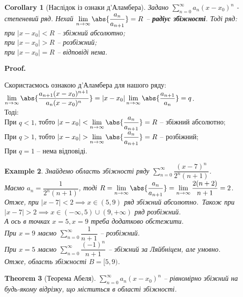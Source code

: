 \documentclass[a4paper, 10pt]{article}
\makeatletter
\def\huge{\displaystyle}
\def\qed{$\blacksquare$}
\theoremstyle{theoremdd}
\newtheorem{theorem}{Theorem}[subsection]
\theoremstyle{theoremdd}
\theoremstyle{theoremdd}
\theoremstyle{theoremdd}
\theoremstyle{theoremdd}
\newtheorem{example}[theorem]{Example}
\theoremstyle{theoremdd}
\theoremstyle{theoremdd}
\theoremstyle{theoremdd}
\theoremstyle{theoremdd}
\newtheorem{corollary}[theorem]{Corollary}
\renewenvironment{proof}[1][Proof.\\]{\par
\pushQED{\hfill \qed}%
\normalfont \topsep6\p@\@plus6\p@\relax
\trivlist
\item\relax
{\bfseries
#1\@addpunct{.}}\hspace\labelsep\ignorespaces
}{%
\popQED\endtrivlist\@endpefalse
}
\makeatother
\begin{document}
\begin{corollary}[Наслідок із ознаки д'Аламбера]
Задано $\huge \sum_{n=0}^\infty a_n(x-x_0)^n$ - степеневий ряд. Нехай $\huge \lim_{n \to \infty} \abs{\dfrac{a_n}{a_{n+1}}} = R$ -- \textbf{радіус збіжності}. Тоді ряд:\\
при $|x-x_0|<R$ -- збіжний абсолютно;\\
при $|x-x_0|>R$ -- розбіжний;\\
при $|x-x_0|=R$ -- відповіді нема.
\end{corollary}

\begin{proof}
Скористаємось ознакою д'Аламбера для нашого ряду:\\
$\huge \lim_{n \to \infty} \abs{\dfrac{a_{n+1}(x-x_0)^{n+1}}{a_n(x-x_0)^n}} = |x-x_0| \lim_{n \to \infty} \abs{\dfrac{a_{n+1}}{a_n}} = q$.\\
Тоді:\\
При $q < 1$, тобто $|x-x_0| < \huge \lim_{n \to \infty} \abs{\dfrac{a_n}{a_{n+1}}} = R$ -- збіжний абсолютно;\\
При $q > 1$, тобто $|x-x_0| > \huge \lim_{n \to \infty} \abs{\dfrac{a_n}{a_{n+1}}} = R$ -- розбіжний;\\
При $q = 1$ -- нема відповіді.
\end{proof}

\begin{example}
Знайдемо область збіжності ряду $\huge\sum_{n=0}^\infty \dfrac{(x-7)^n}{2^n (n+1)}$.\\
Маємо $a_n = \dfrac{1}{2^n (n+1)}$, тоді $R = \huge\lim_{n \to \infty} \abs{\dfrac{a_n}{a_{n+1}}} = \lim_{n \to \infty} \dfrac{2(n+2)}{n+1} = 2$.\\
Отже, при $|x-7| < 2 \implies x \in (5,9)$ ряд збіжний абсолютно.\
Також при $|x-7| > 2 \implies x \in (-\infty,5) \cup (9,+\infty)$ ряд розбіжний.\\
А ось в точках $x = 5, x = 9$ треба додатково обстежити.\\
При $x=9$ маємо $\huge\sum_{n=0}^\infty \dfrac{1}{n+1}$ -- розбіжний.\\
При $x=5$ маємо $\huge\sum_{n=0}^\infty \dfrac{(-1)^n}{n+1}$ -- збіжний за Ляйбніцем, але умовно.\\
Отже, область збіжності $B = [5,9)$.
\end{example}

\begin{theorem}[Теорема Абеля]
$\huge \sum_{n=0}^\infty a_n(x-x_0)^n$ -- рівномірно збіжний на будь-якому відрізку, що міститься в області збіжності.
\end{theorem}
\end{document}
